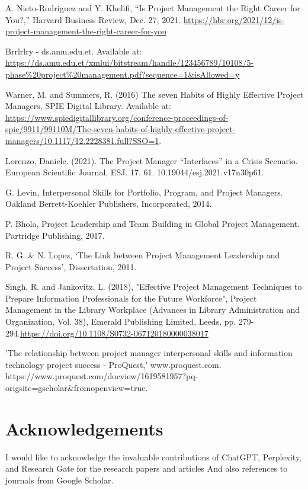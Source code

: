 \documentclass{article}
\begin{document}
\begin{thebibliography}{99}
A. Nieto-Rodriguez and Y. Khelifi, “Is Project Management the Right Career for You?,” Harvard Business Review, Dec. 27, 2021. \url{https://hbr.org/2021/12/is-project-management-the-right-career-for-you}

Brrlrlry - ds.amu.edu.et. Available at: 
\url{https://ds.amu.edu.et/xmlui/bitstream/handle/123456789/10108/5-phase%20project%20management.pdf?sequence=1&isAllowed=y}

Warner, M. and Summers, R. (2016) The seven Habits of Highly Effective Project Managers, SPIE Digital Library. Available at: \url{https://www.spiedigitallibrary.org/conference-proceedings-of-spie/9911/99110M/The-seven-habits-of-highly-effective-project-managers/10.1117/12.2228381.full?SSO=1}. 

Lorenzo, Daniele. (2021). The Project Manager “Interfaces” in a Crisis Scenario. European Scientific Journal, ESJ. 17. 61. 10.19044/esj.2021.v17n30p61. 


G. Levin, Interpersonal Skills for Portfolio, Program, and Project Managers. Oakland Berrett-Koehler Publishers, Incorporated, 2014.


P. Bhola, Project Leadership and Team Building in Global Project Management. Partridge Publishing, 2017.


R. G. \& N. Lopez, ‘The Link between Project Management Leadership and Project Success’, Dissertation, 2011.


Singh, R. and Jankovitz, L. (2018), "Effective Project Management Techniques to Prepare Information Professionals for the Future Workforce", Project Management in the Library Workplace (Advances in Library Administration and Organization, Vol. 38), Emerald Publishing Limited, Leeds, pp. 279-294.\url{https://doi.org/10.1108/S0732-067120180000038017}


'The relationship between project manager interpersonal skills and information technology project success - ProQuest,' www.proquest.com. https://www.proquest.com/docview/1619581957?pq-origsite=gscholar&fromopenview=true.


\end{thebibliography}

\newpage

\section{Acknowledgements}
I would like to acknowledge the invaluable contributions of ChatGPT, Perplexity, and Research Gate for the research papers and articles And also references to journals from Google Scholar.
\end{document}
